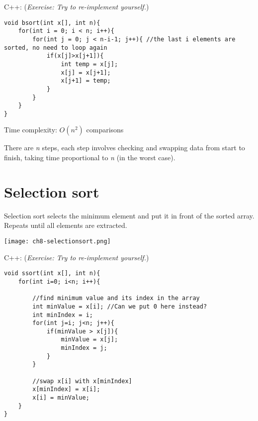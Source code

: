 C++: (\textit{Exercise: Try to re-implement yourself.})
\begin{lstlisting}
void bsort(int x[], int n){
    for(int i = 0; i < n; i++){
        for(int j = 0; j < n-i-1; j++){ //the last i elements are sorted, no need to loop again
            if(x[j]>x[j+1]){
                int temp = x[j];
                x[j] = x[j+1];
                x[j+1] = temp;
            }
        } 
    }
}
\end{lstlisting}

Time complexity: $O(n^2)$ comparisons


There are \textit{n} steps, each step involves checking and swapping data from start to finish, taking time proportional to \textit{n} (in the worst case).

\pagebreak

\section{Selection sort}

Selection sort selects the minimum element and put it in front of the sorted array. Repeats until all elements are extracted.

\texttt{[image: ch8-selectionsort.png]}

\pagebreak


\pagebreak

C++: (\textit{Exercise: Try to re-implement yourself.})
\begin{lstlisting}
void ssort(int x[], int n){
    for(int i=0; i<n; i++){
    
        //find minimum value and its index in the array
        int minValue = x[i]; //Can we put 0 here instead?
        int minIndex = i;
        for(int j=i; j<n; j++){
            if(minValue > x[j]){
                minValue = x[j];
                minIndex = j;
            }
        }
        
        //swap x[i] with x[minIndex]
        x[minIndex] = x[i];
        x[i] = minValue;        
    }
}
\end{lstlisting}

